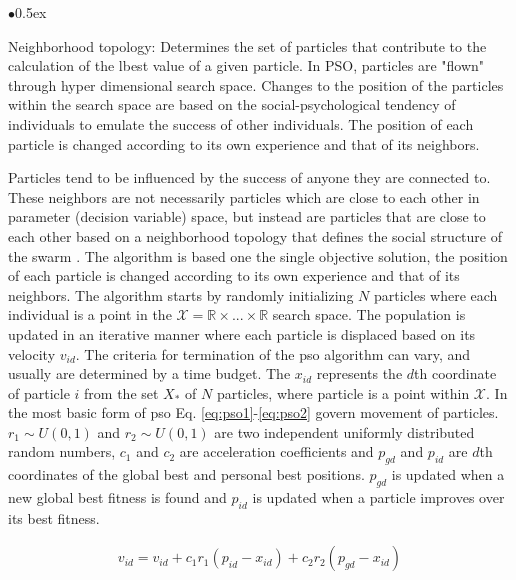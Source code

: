 \documentclass[12pt, runningheads,a4paper]{llncs}
\begin{document}
\begin{list}{$\bullet$}{\itemsep 0.5ex}
\item Neighborhood topology: Determines the set of particles that contribute to the calculation of the lbest value of a given particle. In PSO, particles are "flown" through hyper dimensional search space. Changes to the position of the particles within the search space are based on the social-psychological tendency of individuals to emulate the success of other individuals. The position of each particle is changed according to its own experience and that of its neighbors. 

\end{list}

Particles tend to be influenced by the success of anyone they are connected to. These neighbors are not necessarily particles which are close to each other in parameter (decision variable) space, but instead are particles that are close to each other based on a neighborhood topology that defines the social structure of the swarm \cite{swarm2001}. The algorithm is based one the single objective solution, the position of each particle is changed according to its own experience and that of its neighbors. 
The algorithm starts by randomly initializing $N$ particles where each individual is a point in the $\mathcal{X} = \mathbb{R} \times ... \times \mathbb{R}$ search space. The population is updated in an iterative manner where each particle is displaced based on its velocity $v_{id}$. The criteria for termination of the \ac{pso} algorithm can vary, and usually are determined by a time budget. The $x_{id}$ represents the $d$th coordinate of particle $i$ from the set $X_*$ of $N$ particles, where particle is a point within $\mathcal{X}$. In the most basic form of \ac{pso} Eq. \ref{eq:pso1}-\ref{eq:pso2} govern movement of particles. $r_1 \sim U(0,1)$ and $r_2 \sim U(0,1)$ are two independent uniformly distributed random numbers, $c_1$ and $c_2$ are acceleration coefficients and $p_{gd}$ and $p_{id}$ are $d$th coordinates of the global best and personal best positions. $p_{gd}$ is updated when a new global best fitness is found and $p_{id}$ is updated when a particle improves over its best fitness.



\begin{align} 
\label{eq:pso1}
v_{id}=v_{id}+c_{1}r_{1}(p_{id}-x_{id}) + c_{2}r_{2}(p_{gd}-x_{id})
\end{align}

\end{document}
